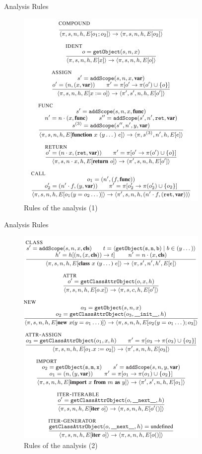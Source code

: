 \documentclass[9pt, xcolor=table]{beamer}
\begin{document}
%
\begin{frame}{Analysis Rules}
	\begin{figure}[htp]
		\includegraphics[height=0.75\paperheight]{analysis_rule_1.jpg}
		\caption{Rules of the analysis (1)}
		\label{fig:analysis_rule_1}
	\end{figure}
\end{frame}
%
\begin{frame}{Analysis Rules}
	\begin{figure}[htp]
		\includegraphics[height=0.75\paperheight]{analysis_rule_2.jpg}
		\caption{Rules of the analysis (2)}
		\label{fig:analysis_rule_2}
	\end{figure}
\end{frame}
%
\end{document}
